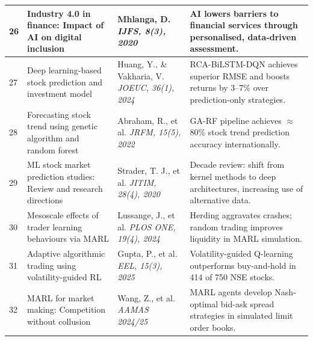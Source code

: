 \documentclass[12pt,a4paper,oneside]{report}
\theoremstyle{definition}
\theoremstyle{remark}
\begin{document}
\begin{center}
\begin{longtable}{|p{0.8cm}|p{4.2cm}|>{\raggedright\arraybackslash}p{4cm}|p{4.5cm}|}
26 & Industry 4.0 in finance: Impact of AI on digital inclusion \cite{Mhlanga2020AI4Finance} & Mhlanga, D. \newline\newline \textit{IJFS, 8(3), 2020} & AI lowers barriers to financial services through personalised, data-driven assessment. \\ \hline

27 & Deep learning-based stock prediction and investment model \cite{Huang2024RCABiLSTM} & Huang, Y., \& Vakharia, V. \newline\newline \textit{JOEUC, 36(1), 2024} & RCA-BiLSTM-DQN achieves superior RMSE and boosts returns by 3--7\% over prediction-only strategies. \\ \hline

28 & Forecasting stock trend using genetic algorithm and random forest \cite{Abraham2022GARandomForest} & Abraham, R., et al. \newline\newline \textit{JRFM, 15(5), 2022} & GA-RF pipeline achieves $\approx$80\% stock trend prediction accuracy internationally. \\ \hline

29 & ML stock market prediction studies: Review and research directions \cite{Strader2020MLStockReview} & Strader, T. J., et al. \newline\newline \textit{JITIM, 28(4), 2020} & Decade review: shift from kernel methods to deep architectures, increasing use of alternative data. \\ \hline

30 & Mesoscale effects of trader learning behaviours via MARL \cite{Lussange2024MARL} & Lussange, J., et al. \newline\newline \textit{PLOS ONE, 19(4), 2024} & Herding aggravates crashes; random trading improves liquidity in MARL simulation. \\ \hline

31 & Adaptive algorithmic trading using volatility-guided RL \cite{Gupta2025VolatilityRL} & Gupta, P., et al. \newline\newline \textit{EEL, 15(3), 2025} & Volatility-guided Q-learning outperforms buy-and-hold in 414 of 750 NSE stocks. \\ \hline

32 & MARL for market making: Competition without collusion \cite{WangMARLMarketMaking2025} & Wang, Z., et al. \newline\newline \textit{AAMAS 2024/25} & MARL agents develop Nash-optimal bid-ask spread strategies in simulated limit order books. \\ \hline


\end{longtable}
\end{center}
\end{document}
